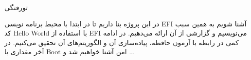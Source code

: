 





‌تورفتگی

در این پروژه بنا داریم تا در ابتدا با محیط برنامه نویسی EFI آشنا شویم به همین سبب کد Hello World با استفاده از EFI می‌نویسیم و گزارشی از آن ارائه می‌دهیم. در ادامه کمی در رابطه با آزمون حافظه، پیاده‌سازی آن و الگوریتم‌های آن تحقیق می‌کنیم. در آخر مقداری با Boot امن آشنا خواهیم شد و ...

